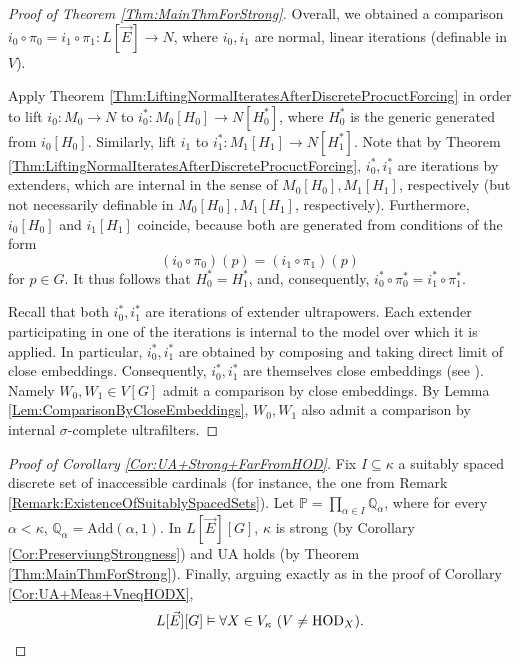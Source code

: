 \documentclass{article}
\theoremstyle{definition}
\theoremstyle{plain}
\newcommand{\po}{\mathbb{P}}
\newcommand{\qo}{\mathbb{Q}}
\begin{document}
\begin{proof}[Proof of Theorem \ref{Thm:MainThmForStrong}]
    Overall, we obtained a comparison $i_0\circ \pi_0 = i_1\circ \pi_1 \colon L[\vec{E}]\to N$, where $i_0, i_1$ are normal, linear iterations (definable in $V$). 
    
    Apply Theorem \ref{Thm:LiftingNormalIteratesAfterDiscreteProcuctForcing} in order to lift $i_0\colon M_0\to N$ to $i^*_0\colon M_0[ H_0 ]\to N[ H^*_0 ]$, where $H^*_0$ is the generic generated from $i_0[H_0]$. Similarly, lift $i_1$ to $i^*_1\colon M_1[H_1]\to N[H^*_1]$. Note that by Theorem \ref{Thm:LiftingNormalIteratesAfterDiscreteProcuctForcing}, $i^*_0, i^*_1$ are iterations by extenders, which are internal in the sense of $M_0[H_0], M_1[H_1]$, respectively (but not necessarily definable in $M_0[H_0], M_1[H_1]$, respectively).  Furthermore, $i_0[H_0]$ and $i_1[H_1]$ coincide, because both are generated from conditions of the form
    $$ (i_0\circ \pi_0)(p) = (i_1\circ \pi_1)(p)$$
    for $p\in G$. It thus follows that $H^*_0 = H^*_1$, and, consequently,  $i^*_0\circ \pi^*_0 = i^*_1\circ \pi^*_1$.

    Recall that both $i^*_0, i^*_1$ are iterations of extender ultrapowers. Each extender participating in one of the iterations is internal to the model over which it is applied. In particular, $i^*_0, i^*_1$ are obtained by composing and taking direct limit of close embeddings. Consequently, $i^*_0, i^*_1$ are themselves close embeddings (see \cite[Lemma 2.2.23]{goldbergtheultrapoweraxiom}). Namely $W_0, W_1\in V[G]$ admit a comparison by close embeddings. By Lemma \ref{Lem:ComparisonByCloseEmbeddings}, $W_0, W_1$ also admit a comparison by internal $\sigma$-complete ultrafilters.
\end{proof}

\begin{proof}[Proof of Corollary \ref{Cor:UA+Strong+FarFromHOD}]
    Fix $I\subseteq \kappa$ a suitably spaced discrete set of inaccessible cardinals (for instance, the one from Remark \ref{Remark:ExistenceOfSuitablySpacedSets}). Let $\po = \prod_{\alpha\in I}\qo_\alpha$, where for every $\alpha<\kappa$, $\qo_\alpha = \text{Add}(\alpha,1)$. In $L[\vec{E}][G]$, $\kappa$ is strong (by Corollary \ref{Cor:PreserviungStrongness}) and {\rm UA} holds (by Theorem \ref{Thm:MainThmForStrong}). Finally, arguing exactly as in the proof of Corollary \ref{Cor:UA+Meas+VneqHODX}, 
    $$L[\vec{E}][G] \vDash \forall X\in V_\kappa\ (V\neq {\rm HOD}_X).$$
\end{proof}

\end{document}
